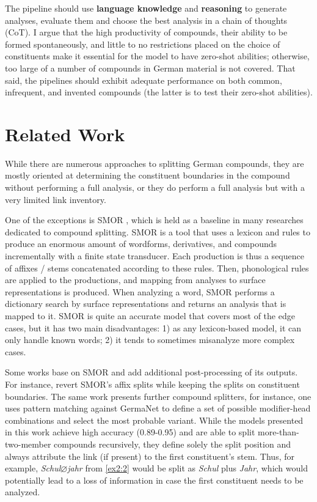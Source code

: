 \documentclass[11pt]{article}
\begin{document}
The pipeline should use \textbf{language knowledge} and \textbf{reasoning} to generate analyses, evaluate them and choose the best analysis in a chain of thoughts (CoT). I argue that the high productivity of compounds, their ability to be formed spontaneously, and little to no restrictions placed on the choice of constituents make it essential for the model to have zero-shot abilities; otherwise, too large of a number of compounds in German material is not covered. That said, the pipelines should exhibit adequate performance on both common, infrequent, and invented compounds (the latter is to test their zero-shot abilities).


\section{Related Work}
\label{sec:related_work}

While there are numerous approaches to splitting German compounds, they are mostly oriented at determining the constituent boundaries in the compound without performing a full analysis, or they do perform a full analysis but with a very limited link inventory.

One of the exceptions is SMOR \cite{schmid-etal-2004-smor}, which is held as a baseline in many researches dedicated to compound splitting. SMOR is a tool that uses a lexicon and rules to produce an enormous amount of wordforms, derivatives, and compounds incrementally with a finite state transducer. Each production is thus a sequence of affixes / stems concatenated according to these rules. Then, phonological rules are applied to the productions, and mapping from analyses to surface representations is produced. When analyzing a word, SMOR performs a dictionary search by surface representations and returns an analysis that is mapped to it. SMOR is quite an accurate model that covers most of the edge cases, but it has two main disadvantages: 1) as any lexicon-based model, it can only handle known words; 2) it tends to sometimes misanalyze more complex cases.

Some works base on SMOR and add additional post-processing of its outputs. For instance, \citet{henrich-hinrichs-2011-determining} revert SMOR's affix splits while keeping the splits on constituent boundaries. The same work presents further compound splitters, for instance, one uses pattern matching against GermaNet \cite{kunze-lemnitzer-2002-germanet} to define a set of possible modifier-head combinations and select the most probable variant. While the models presented in this work achieve high accuracy (0.89-0.95) and are able to split more-than-two-member compounds recursively, they define solely the split position and always attribute the link (if present) to the first constituent's stem. Thus, for example, \textit{Schul\underline{$\varnothing$}jahr} from \ref{ex2:2} would be split as \textit{Schul} plus \textit{Jahr}, which would potentially lead to a loss of information in case the first constituent needs to be analyzed.
\end{document}
